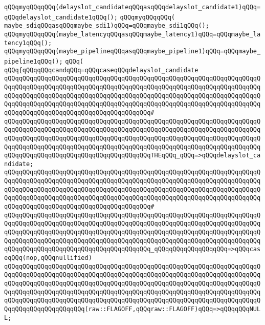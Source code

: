 \verb|qQQqmyqQQqqQQq(delayslot_candidateqQQqasqQQqdelayslot_candidate1)qQQq=qQQqdelayslot_candidate1qQQq();|\newline
\verb|qQQqmyqQQqqQQq(|\newline
\verb|maybe_sdiqQQqasqQQqmaybe_sdi1)qQQq=qQQqmaybe_sdi1qQQq();|\newline
\verb|qQQqmyqQQqqQQq(maybe_latencyqQQqasqQQqmaybe_latency1)qQQq=qQQqmaybe_latency1qQQq();|\newline
\verb|qQQqmyqQQqqQQq(maybe_pipelineqQQqasqQQqmaybe_pipeline1)qQQq=qQQqmaybe_pipeline1qQQq();|\newline
\verb|qQQq(|\newline
\verb|qQQq{qQQqqQQqcandqQQq=qQQqcaseqQQqdelayslot_candidate|\newline
\verb|qQQqqQQqqQQqqQQqqQQqqQQqqQQqqQQqqQQqqQQqqQQqqQQqqQQqqQQqqQQqqQQqqQQqqQQqqQQqqQQqqQQqqQQqqQQqqQQqqQQqqQQqqQQqqQQqqQQqqQQqqQQqqQQqqQQqqQQqqQQqqQQqqQQqqQQqqQQqqQQqqQQqqQQqqQQqqQQqqQQqqQQqqQQqqQQqqQQqqQQqqQQqqQQqqQQqqQQqqQQqqQQqqQQqqQQqqQQqqQQqqQQqqQQqqQQqqQQqqQQqqQQqqQQqqQQqqQQqqQQqqQQqqQQqqQQqqQQqqQQqqQQqqQQqqQQqqQQqqQQq#|\newline
\verb|qQQqqQQqqQQqqQQqqQQqqQQqqQQqqQQqqQQqqQQqqQQqqQQqqQQqqQQqqQQqqQQqqQQqqQQqqQQqqQQqqQQqqQQqqQQqqQQqqQQqqQQqqQQqqQQqqQQqqQQqqQQqqQQqqQQqqQQqqQQqqQQqqQQqqQQqqQQqqQQqqQQqqQQqqQQqqQQqqQQqqQQqqQQqqQQqqQQqqQQqqQQqqQQqqQQqqQQqqQQqqQQqqQQqqQQqqQQqqQQqqQQqqQQqqQQqqQQqqQQqqQQqqQQqqQQqqQQqqQQqqQQqqQQqqQQqqQQqqQQqqQQqqQQqqQQqqQQqqQQqTHEqQQq_qQQq=>qQQqdelayslot_candidate;|\newline
\verb|qQQqqQQqqQQqqQQqqQQqqQQqqQQqqQQqqQQqqQQqqQQqqQQqqQQqqQQqqQQqqQQqqQQqqQQqqQQqqQQqqQQqqQQqqQQqqQQqqQQqqQQqqQQqqQQqqQQqqQQqqQQqqQQqqQQqqQQqqQQqqQQqqQQqqQQqqQQqqQQqqQQqqQQqqQQqqQQqqQQqqQQqqQQqqQQqqQQqqQQqqQQqqQQqqQQqqQQqqQQqqQQqqQQqqQQqqQQqqQQqqQQqqQQqqQQqqQQqqQQqqQQqqQQqqQQqqQQqqQQqqQQqqQQqqQQqqQQqqQQqqQQqqQQqqQQqqQQqqQQq#|\newline
\verb|qQQqqQQqqQQqqQQqqQQqqQQqqQQqqQQqqQQqqQQqqQQqqQQqqQQqqQQqqQQqqQQqqQQqqQQqqQQqqQQqqQQqqQQqqQQqqQQqqQQqqQQqqQQqqQQqqQQqqQQqqQQqqQQqqQQqqQQqqQQqqQQqqQQqqQQqqQQqqQQqqQQqqQQqqQQqqQQqqQQqqQQqqQQqqQQqqQQqqQQqqQQqqQQqqQQqqQQqqQQqqQQqqQQqqQQqqQQqqQQqqQQqqQQqqQQqqQQqqQQqqQQqqQQqqQQqqQQqqQQqqQQqqQQqqQQqqQQqqQQqqQQqqQQqqQQqqQQqqQQq_qQQqqQQqqQQqqQQqqQQq=>qQQqcaseqQQq(nop,qQQqnullified)|\newline
\verb|qQQqqQQqqQQqqQQqqQQqqQQqqQQqqQQqqQQqqQQqqQQqqQQqqQQqqQQqqQQqqQQqqQQqqQQqqQQqqQQqqQQqqQQqqQQqqQQqqQQqqQQqqQQqqQQqqQQqqQQqqQQqqQQqqQQqqQQqqQQqqQQqqQQqqQQqqQQqqQQqqQQqqQQqqQQqqQQqqQQqqQQqqQQqqQQqqQQqqQQqqQQqqQQqqQQqqQQqqQQqqQQqqQQqqQQqqQQqqQQqqQQqqQQqqQQqqQQqqQQqqQQqqQQqqQQqqQQqqQQqqQQqqQQqqQQqqQQqqQQqqQQqqQQqqQQqqQQqqQQqqQQqqQQqqQQqqQQqqQQqqQQqqQQqqQQqqQQqqQQqqQQqqQQqqQQq(raw::FLAGOFF,qQQqraw::FLAGOFF)qQQq=>qQQqqQQqNULL;|\newline
